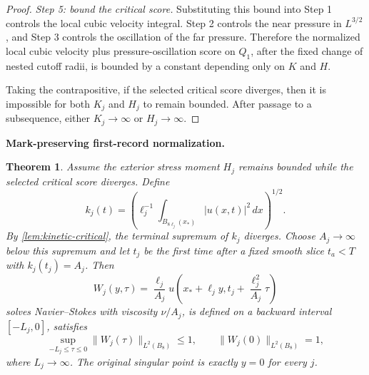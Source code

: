 \documentclass[11pt]{article}
\newtheorem{theorem}{Theorem}[section]
\theoremstyle{definition}\newtheorem{problem}[theorem]{Problem}
\theoremstyle{definition}
\theoremstyle{remark}
\begin{document}
\begin{proof}
\emph{Step 5: bound the critical score.}
Substituting this bound into Step 1 controls the local cubic velocity integral.
Step 2 controls the near pressure in \(L^{3/2}\), and Step 3 controls the
oscillation of the far pressure.  Therefore the normalized local cubic
velocity plus pressure-oscillation score on \(Q_1\), after the fixed change of
nested cutoff radii, is bounded by a constant depending only on \(K\) and
\(H\).

Taking the contrapositive, if the selected critical score diverges, then it is
impossible for both \(K_j\) and \(H_j\) to remain bounded.  After passage to a
subsequence, either \(K_j\to\infty\) or \(H_j\to\infty\).
\end{proof}

\medskip
\noindent\textbf{Mark-preserving first-record normalization.}
\begin{theorem}\label{thm:marked-record}
Assume the exterior stress moment $H_j$ remains bounded while the selected critical score diverges.  Define
\[
k_j(t)=\left(\ell_j^{-1}\int_{B_{8\ell_j}(x_*)}|u(x,t)|^2\,dx\right)^{1/2}.
\]
By \cref{lem:kinetic-critical}, the terminal supremum of $k_j$ diverges. Choose $A_j\to\infty$ below this supremum and let $t_j$ be the first time after a fixed smooth slice $t_a<T$ with $k_j(t_j)=A_j$.  Then
\[
W_j(y,\tau)=\frac{\ell_j}{A_j}
 u\!\left(x_*+\ell_jy,t_j+\frac{\ell_j^2}{A_j}\tau\right)
\]
solves Navier--Stokes with viscosity $\nu/A_j$, is defined on a backward interval \([-L_j,0]\), satisfies
\[
\sup_{-L_j\le\tau\le0}\|W_j(\tau)\|_{L^2(B_8)}\le1,
\qquad
\|W_j(0)\|_{L^2(B_8)}=1,
\]
where \(L_j\to\infty\).  The original singular point is exactly $y=0$ for every $j$.
\end{theorem}
\end{document}
